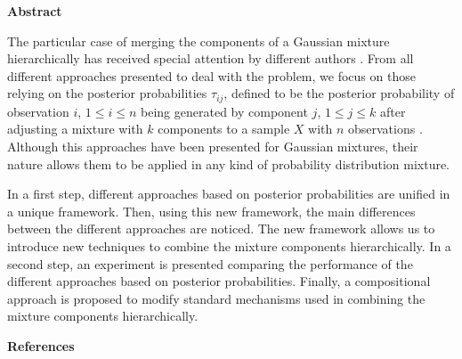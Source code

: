 \vskip 0.5cm {\centerline{\bf Abstract}}

The particular case of merging the components of a Gaussian mixture hierarchically has received special attention by different authors \cite{hennig2010methods}. From all different approaches presented to deal with the problem, we focus on those relying on the posterior probabilities $\tau_{ij}$, defined to be the posterior probability of observation $i$, $1 \leq i \leq n$ being generated by component $j$, $1\leq j\leq k$ after adjusting a mixture with $k$ components  to a sample $X$ with $n$ observations \cite{melnykov2013distribution,lee2004combining,hennig2010methods,baudry2010combining,pastore2013merging,ComasCufi2013}.  Although this approaches have been presented for Gaussian mixtures, their nature allows them to be applied in any kind of probability distribution mixture.

In a first step, different approaches based on posterior probabilities are unified in a unique framework. Then, using this new framework, the main differences between the different approaches are noticed. The new framework allows us to introduce new techniques to combine the mixture components hierarchically.  In a second step, an experiment is presented comparing the performance of the different approaches based on posterior probabilities. Finally, a compositional approach is proposed to modify standard mechanisms used in combining the mixture components hierarchically.

\vskip 0.2cm {\bf References}


{}

